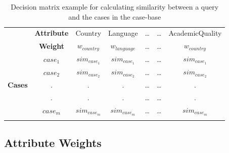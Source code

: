 \begin{table}[h]
\centering
\caption[Decision matrix for a query]{Decision matrix example for calculating similarity between a query and the cases in the case-base}
\label{tab:decision_matrix}
\begin{tabular}{ccccccc}
\cline{2-7}
\multicolumn{1}{l|}{} & \multicolumn{1}{c|}{\textbf{Attribute}} & \multicolumn{1}{c|}{Country} & \multicolumn{1}{c|}{Language} & \multicolumn{1}{c|}{\ldots} & \multicolumn{1}{c|}{\ldots} & \multicolumn{1}{c|}{AcademicQuality} \\ \cline{2-7} 
\multicolumn{1}{l|}{} & \multicolumn{1}{c|}{\textbf{Weight}} & \multicolumn{1}{c|}{$w_{country}$} & \multicolumn{1}{c|}{$w_{language}$} & \multicolumn{1}{c|}{\ldots} & \multicolumn{1}{c|}{\ldots} & \multicolumn{1}{c|}{$w_{country}$} \\
\hline
\multicolumn{1}{|c|}{\multirow{5}{*}{\textbf{Cases}}} & \multicolumn{1}{c|}{$case_{1}$} & \multicolumn{1}{c|}{$sim_{case_{1}}$} & \multicolumn{1}{c|}{$sim_{case_{1}}$} & \multicolumn{1}{c|}{\ldots} & \multicolumn{1}{c|}{\ldots} & \multicolumn{1}{c|}{$sim_{case_{1}}$} \\
\multicolumn{1}{|c|}{} & \multicolumn{1}{c|}{$case_{2}$} & \multicolumn{1}{c|}{$sim_{case_{2}}$} & \multicolumn{1}{c|}{$sim_{case_{2}}$} & \multicolumn{1}{c|}{\ldots} & \multicolumn{1}{c|}{\ldots} & \multicolumn{1}{c|}{$sim_{case_{2}}$} \\
\multicolumn{1}{|c|}{} & \multicolumn{1}{c|}{.} & \multicolumn{1}{c|}{.} & \multicolumn{1}{c|}{.} & \multicolumn{1}{c|}{\ldots} & \multicolumn{1}{c|}{\ldots} & \multicolumn{1}{c|}{.} \\
\multicolumn{1}{|c|}{} & \multicolumn{1}{c|}{.} & \multicolumn{1}{c|}{.} & \multicolumn{1}{c|}{.} & \multicolumn{1}{c|}{\ldots} & \multicolumn{1}{c|}{\ldots} & \multicolumn{1}{c|}{.} \\
\multicolumn{1}{|c|}{} & \multicolumn{1}{c|}{$case_{m}$} & \multicolumn{1}{c|}{$sim_{case_{m}}$} & \multicolumn{1}{c|}{$sim_{case_{m}}$} & \multicolumn{1}{c|}{\ldots} & \multicolumn{1}{c|}{\ldots} & \multicolumn{1}{c|}{$sim_{case_{m}}$} \\ \hline
\multicolumn{1}{l}{} & \multicolumn{1}{l}{} & \multicolumn{1}{l}{} & \multicolumn{1}{l}{} & \multicolumn{1}{l}{} & \multicolumn{1}{l}{} & \multicolumn{1}{l}{}
\end{tabular}
\end{table}


\subsection{Attribute Weights}\label{sec:weighting}

